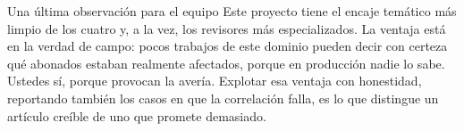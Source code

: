 \documentclass[11pt,a4paper]{article}
\begin{document}
\vspace{8pt}
\begin{aviso}{Una última observación para el equipo}
	Este proyecto tiene el encaje temático más limpio de los cuatro y, a la vez, los revisores más especializados. La ventaja está en la verdad de campo: pocos trabajos de este dominio pueden decir con certeza qué abonados estaban realmente afectados, porque en producción nadie lo sabe. Ustedes sí, porque provocan la avería. Explotar esa ventaja con honestidad, reportando también los casos en que la correlación falla, es lo que distingue un artículo creíble de uno que promete demasiado.
\end{aviso}

\nocite{*}


\end{document}
